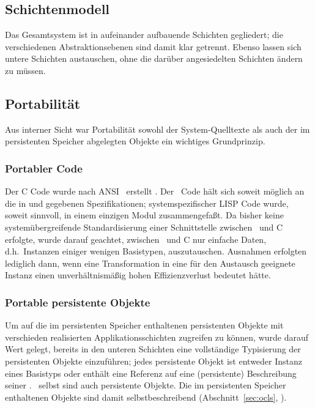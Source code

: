 \subsection{Schichtenmodell}
%
Das Gesamtsystem ist in aufeinander aufbauende Schichten gegliedert;
die verschiedenen Abstraktionsebenen sind damit klar getrennt. Ebenso
lassen sich untere Schichten austauschen, ohne die dar\"{u}ber
angesiedelten Schichten \"{a}ndern zu m\"{u}ssen.
%
\subsection{Portabilit\"{a}t}
%
Aus interner Sicht war Portabilit\"{a}t sowohl der System-Quelltexte als
auch der im persistenten Speicher abgelegten Objekte ein wichtiges
Grundprinzip.
%
\subsubsection{Portabler Code}
%
Der C Code wurde nach ANSI \std\ erstellt \cite{bib:ker88}. Der
\cl\ Code h\"{a}lt sich soweit m\"{o}glich an die in \cite{bib:st90} und
\cite{bib:amop91} gegebenen Spezifikationen; systemspezifischer
LISP Code wurde, soweit sinnvoll, in einem einzigen Modul
zusammengefa\ss{}t. Da bisher keine system\"{u}bergreifende
Standardisierung einer Schnittstelle zwischen \cl\ und C erfolgte,
wurde darauf geachtet, zwischen \cl\ und C nur
einfache Daten, d.h.\ Instanzen einiger wenigen Basistypen,
auszutauschen. Ausnahmen erfolgten lediglich dann, wenn eine
Transformation in eine f\"{u}r den Austausch geeignete Instanz einen
unverh\"{a}ltnism\"{a}\ss{}ig hohen Effizienzverlust bedeutet h\"{a}tte.
%
\subsubsection{Portable persistente Objekte}
%
Um auf die im persistenten Speicher enthaltenen persistenten Objekte
mit verschieden realisierten Applikationsschichten zugreifen zu k\"{o}n\-nen,
wurde darauf Wert gelegt, bereits in den unteren Schichten eine
vollst\"{a}ndige Typisierung der persistenten Objekte einzuf\"{u}hren; jedes
persistente Objekt ist entweder Instanz eines Basistyps oder enth\"{a}lt
eine Referenz auf eine (persistente) Beschreibung seiner \cls.
\clsdo[e]\ selbst sind auch persistente Objekte.
Die im persistenten Speicher enthaltenen Objekte sind damit
selbstbeschreibend (Abschnitt~\ref{sec:ocls},
\citepage{\pageref{sec:ocls}}).
%
